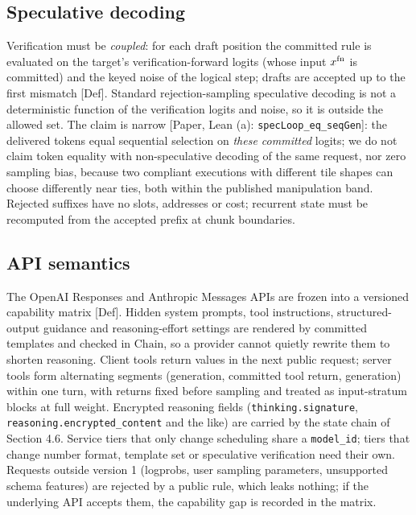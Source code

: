 \documentclass[10pt]{article}
\begin{document}
\subsection{Speculative decoding}
Verification must be \emph{coupled}: for each draft position the committed rule is evaluated on the target's verification-forward logits (whose input $x^{\rm fn}$ is committed) and the keyed noise of the logical step; drafts are accepted up to the first mismatch [Def]. Standard rejection-sampling speculative decoding is not a deterministic function of the verification logits and noise, so it is outside the allowed set. The claim is narrow [Paper, Lean (a): \texttt{specLoop\_\allowbreak{}eq\_\allowbreak{}seqGen}]: the delivered tokens equal sequential selection on \emph{these committed} logits; we do not claim token equality with non-speculative decoding of the same request, nor zero sampling bias, because two compliant executions with different tile shapes can choose differently near ties, both within the published manipulation band. Rejected suffixes have no slots, addresses or cost; recurrent state must be recomputed from the accepted prefix at chunk boundaries.

\subsection{API semantics}
The OpenAI Responses and Anthropic Messages APIs are frozen into a versioned capability matrix [Def]. Hidden system prompts, tool instructions, structured-output guidance and reasoning-effort settings are rendered by committed templates and checked in $\mathrm{Chain}$, so a provider cannot quietly rewrite them to shorten reasoning. Client tools return values in the next public request; server tools form alternating segments (generation, committed tool return, generation) within one turn, with returns fixed before sampling and treated as input-stratum blocks at full weight. Encrypted reasoning fields (\texttt{thinking.\allowbreak{}signature}, \texttt{reasoning.\allowbreak{}encrypted\_\allowbreak{}content} and the like) are carried by the state chain of Section 4.6. Service tiers that only change scheduling share a \texttt{model\_\allowbreak{}id}; tiers that change number format, template set or speculative verification need their own. Requests outside version 1 (logprobs, user sampling parameters, unsupported schema features) are rejected by a public rule, which leaks nothing; if the underlying API accepts them, the capability gap is recorded in the matrix.
\end{document}
